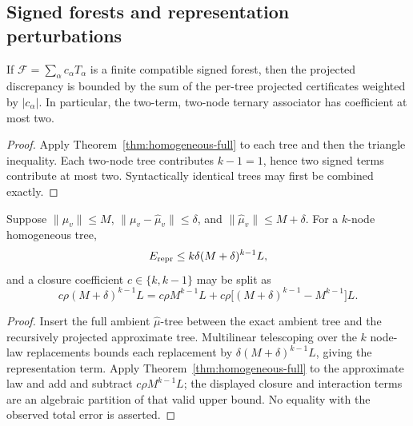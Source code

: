 \subsection{Signed forests and representation perturbations}

\begin{corollary}
If \(\mathcal F=\sum_\alpha c_\alpha T_\alpha\) is a finite compatible
signed forest, then the projected discrepancy is bounded by the sum of the
per-tree projected certificates weighted by \(\lvert c_\alpha\rvert\).
In particular, the two-term, two-node ternary associator has coefficient
at most two.
\end{corollary}

\begin{proof}
Apply Theorem~\ref{thm:homogeneous-full} to each tree and then the triangle
inequality. Each two-node tree contributes \(k-1=1\), hence two signed
terms contribute at most two. Syntactically identical trees may first be
combined exactly.
\end{proof}

\begin{proposition}
\label{prop:cp-full}
Suppose \(\lVert\mu_v\rVert\le M\),
\(\lVert\mu_v-\widehat\mu_v\rVert\le\delta\), and
\(\lVert\widehat\mu_v\rVert\le M+\delta\). For a \(k\)-node homogeneous
tree,
\[
 E_{\rm repr}\le k\delta(M+\delta)^{k-1}L,
\]
and a closure coefficient \(c\in\{k,k-1\}\) may be split as
\[
 c\rho(M+\delta)^{k-1}L
 =c\rho M^{k-1}L
 +c\rho\bigl[(M+\delta)^{k-1}-M^{k-1}\bigr]L.
\]
\end{proposition}

\begin{proof}
Insert the full ambient \(\widehat\mu\)-tree between the exact ambient tree
and the recursively projected approximate tree. Multilinear telescoping
over the \(k\) node-law replacements bounds each replacement by
\(\delta(M+\delta)^{k-1}L\), giving the representation term. Apply
Theorem~\ref{thm:homogeneous-full} to the approximate law and add and
subtract \(c\rho M^{k-1}L\); the displayed closure and interaction terms
are an algebraic partition of that valid upper bound. No equality with the
observed total error is asserted.
\end{proof}
